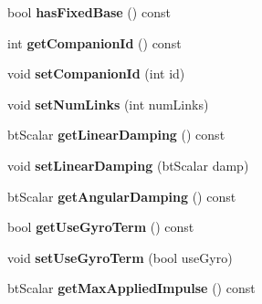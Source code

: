 \begin{DoxyCompactItemize}
\item 
\hypertarget{classbt_multi_body_a3585e41fed4768e25da2fb6caa90f182}{bool {\bfseries has\+Fixed\+Base} () const }\label{classbt_multi_body_a3585e41fed4768e25da2fb6caa90f182}

\item 
\hypertarget{classbt_multi_body_a24602b0578403cdc8adfaca32ea06647}{int {\bfseries get\+Companion\+Id} () const }\label{classbt_multi_body_a24602b0578403cdc8adfaca32ea06647}

\item 
\hypertarget{classbt_multi_body_aec0ff1d617e7d31344ad4f4c83e808e7}{void {\bfseries set\+Companion\+Id} (int id)}\label{classbt_multi_body_aec0ff1d617e7d31344ad4f4c83e808e7}

\item 
\hypertarget{classbt_multi_body_ab2b5bc6f3953c9768bb6caa0aba43e63}{void {\bfseries set\+Num\+Links} (int num\+Links)}\label{classbt_multi_body_ab2b5bc6f3953c9768bb6caa0aba43e63}

\item 
\hypertarget{classbt_multi_body_acd549ec0b522a89558745eea1d78aacc}{bt\+Scalar {\bfseries get\+Linear\+Damping} () const }\label{classbt_multi_body_acd549ec0b522a89558745eea1d78aacc}

\item 
\hypertarget{classbt_multi_body_a51e85f96027e3b2d6a7c87d60b3c7660}{void {\bfseries set\+Linear\+Damping} (bt\+Scalar damp)}\label{classbt_multi_body_a51e85f96027e3b2d6a7c87d60b3c7660}

\item 
\hypertarget{classbt_multi_body_a0fcf845fcabb06ac2661817622973e19}{bt\+Scalar {\bfseries get\+Angular\+Damping} () const }\label{classbt_multi_body_a0fcf845fcabb06ac2661817622973e19}

\item 
\hypertarget{classbt_multi_body_ae0f6093898427b056d9111790b870e01}{bool {\bfseries get\+Use\+Gyro\+Term} () const }\label{classbt_multi_body_ae0f6093898427b056d9111790b870e01}

\item 
\hypertarget{classbt_multi_body_a2bcc1281a4e5d88d68c1caf6baa691c7}{void {\bfseries set\+Use\+Gyro\+Term} (bool use\+Gyro)}\label{classbt_multi_body_a2bcc1281a4e5d88d68c1caf6baa691c7}

\item 
\hypertarget{classbt_multi_body_afb1a74353d88c63fa8dcad83c49d96e9}{bt\+Scalar {\bfseries get\+Max\+Applied\+Impulse} () const }\label{classbt_multi_body_afb1a74353d88c63fa8dcad83c49d96e9}


\end{DoxyCompactItemize}
